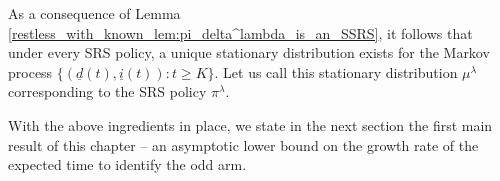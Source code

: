 As a consequence of Lemma \ref{restless_with_known_lem:pi_delta^lambda_is_an_SSRS}, it follows that under every SRS policy, a unique stationary distribution exists for the Markov process $\{(\underline{d}(t),\underline{i}(t)):t\geq K\}$. Let us call this stationary distribution $\mu^\lambda$ corresponding to the SRS policy $\pi^\lambda$.

With the above ingredients in place, we state in the next section the first main result of this chapter -- an asymptotic lower bound on {\color{black} the growth rate of} the expected time to identify the odd arm. 

%


